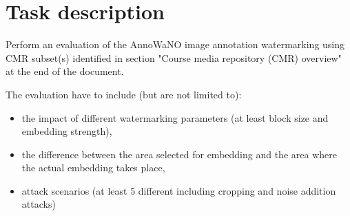 \section{Task description}

Perform an evaluation of the AnnoWaNO image annotation watermarking using CMR subset(s) identified in section "Course media repository (CMR) overview" at the end of the document.

The evaluation have to include (but are not limited to):
\begin{itemize}
	\item the impact of different watermarking parameters (at least block size and embedding strength),
	\item the difference between the area selected for embedding and the area where the actual embedding takes place,
	\item attack scenarios (at least 5 different including cropping and noise addition attacks)
\end{itemize}